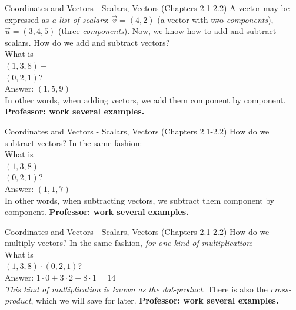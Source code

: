 \documentclass{beamer}
\begin{document}
\begin{frame}{Coordinates and Vectors - Scalars, Vectors (Chapters 2.1-2.2)}
A vector may be expressed as \textit{a list of scalars}: $\vec{v} = (4,2)$ (a vector with two \textit{components}), $\vec{u} = (3,4,5)$ (three \textit{components}).  Now, we know how to add and subtract scalars.  How do we add and subtract vectors? \\
\vspace{0.5cm}
What is\\
$(1,3,8)+$\\ $(0,2,1)$? \\
Answer: $(1,5,9)$ \\
\vspace{0.5cm}
In other words, when adding vectors, we add them component by component. \textbf{Professor: work several examples.}
\end{frame}

\begin{frame}{Coordinates and Vectors - Scalars, Vectors (Chapters 2.1-2.2)}
How do we subtract vectors? In the same fashion:\\
\vspace{0.5cm}
What is\\
$(1,3,8)-$\\ $(0,2,1)$? \\
Answer: $(1,1,7)$ \\
\vspace{0.5cm}
In other words, when subtracting vectors, we subtract them component by component. \textbf{Professor: work several examples.}
\end{frame}

\begin{frame}{Coordinates and Vectors - Scalars, Vectors (Chapters 2.1-2.2)}
How do we multiply vectors? In the same fashion, \textit{for one kind of multiplication}:\\
\vspace{0.5cm}
What is\\
$(1,3,8)\cdot (0,2,1)$? \\
Answer: $1\cdot 0 + 3 \cdot 2 + 8 \cdot 1 = 14$ \\
\vspace{0.5cm}
\textit{This kind of multiplication is known as the dot-product}.  There is also the \textit{cross-product}, which we will save for later. \textbf{Professor: work several examples.}
\end{frame}
\end{document}
